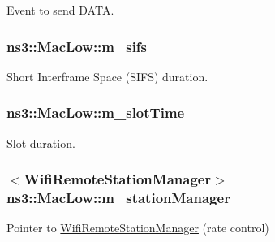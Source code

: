 Event to send D\+A\+TA. 

\subsubsection[{\texorpdfstring{m\+\_\+sifs}{m_sifs}}]{ ns3\+::\+Mac\+Low\+::m\+\_\+sifs\hspace{0.3cm}{\ttfamily [private]}}\hypertarget{classns3_1_1MacLow_ad8abf26b1e85563b8e9b2cfd1849226c}{}\label{classns3_1_1MacLow_ad8abf26b1e85563b8e9b2cfd1849226c}


Short Interframe Space (S\+I\+FS) duration. 

\subsubsection[{\texorpdfstring{m\+\_\+slot\+Time}{m_slotTime}}]{ ns3\+::\+Mac\+Low\+::m\+\_\+slot\+Time\hspace{0.3cm}{\ttfamily [private]}}\hypertarget{classns3_1_1MacLow_a76eff59c8a4983b9830edf3c6ef5e76e}{}\label{classns3_1_1MacLow_a76eff59c8a4983b9830edf3c6ef5e76e}


Slot duration. 

\subsubsection[{\texorpdfstring{m\+\_\+station\+Manager}{m_stationManager}}]{$<${\bf Wifi\+Remote\+Station\+Manager}$>$ ns3\+::\+Mac\+Low\+::m\+\_\+station\+Manager\hspace{0.3cm}{\ttfamily [private]}}\hypertarget{classns3_1_1MacLow_a1c7f45f071f9e5eb97764f64e5cdaf1b}{}\label{classns3_1_1MacLow_a1c7f45f071f9e5eb97764f64e5cdaf1b}


Pointer to \hyperlink{classns3_1_1WifiRemoteStationManager}{Wifi\+Remote\+Station\+Manager} (rate control) 

